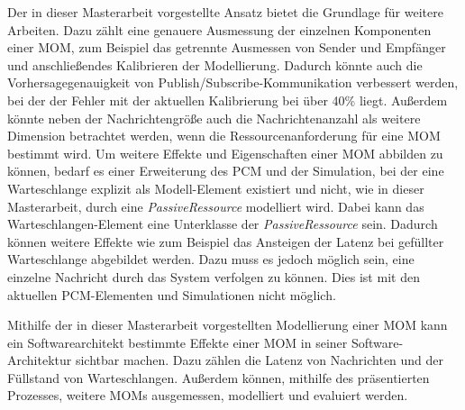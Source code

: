 Der in dieser Masterarbeit vorgestellte Ansatz bietet die Grundlage für weitere Arbeiten. Dazu zählt eine genauere Ausmessung der einzelnen Komponenten einer MOM, zum Beispiel das getrennte Ausmessen von Sender und Empfänger und anschließendes Kalibrieren der Modellierung. Dadurch könnte auch die Vorhersagegenauigkeit von Publish/Subscribe-Kommunikation verbessert werden, bei der der Fehler mit der aktuellen Kalibrierung bei über 40\% liegt. Außerdem könnte neben der Nachrichtengröße auch die Nachrichtenanzahl als weitere Dimension betrachtet werden, wenn die Ressourcenanforderung für eine MOM bestimmt wird. Um weitere Effekte und Eigenschaften einer MOM abbilden zu können, bedarf es einer Erweiterung des PCM und der Simulation, bei der eine Warteschlange explizit als Modell-Element existiert und nicht, wie in dieser Masterarbeit, durch eine \emph{PassiveRessource} modelliert wird. Dabei kann das Warteschlangen-Element eine Unterklasse der \emph{PassiveRessource} sein. Dadurch können weitere Effekte wie zum Beispiel das Ansteigen der Latenz bei gefüllter Warteschlange abgebildet werden. Dazu muss es jedoch möglich sein, eine einzelne Nachricht durch das System verfolgen zu können. Dies ist mit den aktuellen PCM-Elementen und Simulationen nicht möglich. \par
Mithilfe der in dieser Masterarbeit vorgestellten Modellierung einer MOM kann ein Softwarearchitekt bestimmte Effekte einer MOM in seiner Software-Architektur sichtbar machen. Dazu zählen die Latenz von Nachrichten und der Füllstand von Warteschlangen. Außerdem können, mithilfe des präsentierten Prozesses, weitere MOMs ausgemessen, modelliert und evaluiert werden. 